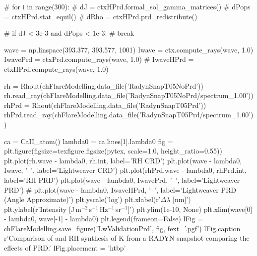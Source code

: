 \begin{pycode}[FlareModelling]
# for i in range(300):
#     dJ = ctxHPrd.formal_sol_gamma_matrices()
#     dPops = ctxHPrd.stat_equil()
#     dRho = ctxHPrd.prd_redistribute()

#     if dJ < 3e-3 and dPops < 1e-3:
#         break

wave = np.linspace(393.377, 393.577, 1001)
Iwave = ctx.compute_rays(wave, 1.0)
IwavePrd = ctxPrd.compute_rays(wave, 1.0)
# IwaveHPrd = ctxHPrd.compute_rays(wave, 1.0)

rh = Rhout(chFlareModelling.data_file('RadynSnapT05NoPrd'))
rh.read_ray(chFlareModelling.data_file('RadynSnapT05NoPrd/spectrum_1.00'))
rhPrd = Rhout(chFlareModelling.data_file('RadynSnapT05Prd'))
rhPrd.read_ray(chFlareModelling.data_file('RadynSnapT05Prd/spectrum_1.00'))

ca = CaII_atom()
lambda0 = ca.lines[1].lambda0
fig = plt.figure(figsize=texfigure.figsize(pytex, scale=1.0, height_ratio=0.55))
plt.plot(rh.wave - lambda0, rh.int, label='RH CRD')
plt.plot(wave - lambda0, Iwave, '--', label='Lightweaver CRD')
plt.plot(rhPrd.wave - lambda0, rhPrd.int, label='RH PRD')
plt.plot(wave - lambda0, IwavePrd, '--', label='Lightweaver PRD')
# plt.plot(wave - lambda0, IwaveHPrd, '--', label='Lightweaver PRD (Angle Approximate)')
plt.yscale('log')
plt.xlabel(r'$\Delta\lambda$ [nm]')
plt.ylabel(r'Intensity [J\,m$^{-2}$\,s$^{-1}$\,Hz$^{-1}$\,sr$^{-1}$]')
plt.ylim(1e-10, None)
plt.xlim(wave[0] - lambda0, wave[-1] - lambda0)
plt.legend(frameon=False)
lFig = chFlareModelling.save_figure('LwValidationPrd', fig, fext='.pgf')
lFig.caption = r'Comparison of \Lw{} and RH synthesis of \Caii{} K from a RADYN snapshot comparing the effects of PRD.'
lFig.placement = 'htbp'
\end{pycode}
